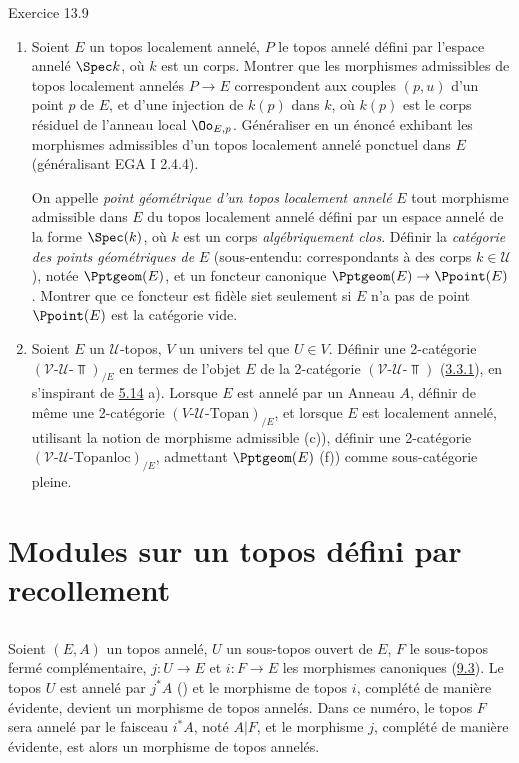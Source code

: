 \documentclass[10pt]{../fichiers-configuration-latex/smfart}
\begin{document}
\begin{enonce*}[remark]{Exercice 13.9}
\begin{enumerate}
\item Soient $E$ un topos localement annelé, $P$ le topos annelé
défini par l'espace annelé $\Spec k$, où $k$ est un corps. Montrer
que les morphismes admissibles de topos localement annelés
$P\rightarrow E$ correspondent aux couples $(p,u)$ d'un point $p$ de
$E$, et d'une injection de $k(p)$ dans $k$, où $k(p)$ est le corps
résiduel de l'anneau local ${\Oo}_{E,p}$. Généraliser en un
énoncé exhibant les morphismes admissibles d'un topos localement
annelé ponctuel dans $E$ (généralisant EGA I 2.4.4).

On appelle \emph{point géométrique d'un topos localement
  annelé} $E$
tout morphisme admissible dans $E$ du topos localement annelé défini
par un espace annelé de la forme $\Spec(k)$, où $k$ est un corps
\emph{algébriquement clos}. Définir la \emph{catégorie des points
géométriques de} $E$ (sous-entendu: correspondants à des corps $k\in
𝒰$), notée $\Pptgeom(E)$, et un foncteur canonique
$\Pptgeom(E)\rightarrow \Ppoint(E)$. Montrer que ce foncteur est
fidèle si\pageoriginale et seulement si $E$ n'a pas de point \ie
$\Ppoint(E)$ est la catégorie vide.

\item Soient $E$ un $𝒰$-topos, $V$ un univers tel que $U\in
V$. Définir une 2-catégorie
$(𝒱\text{-}𝒰\text{-}\Top)_{/E}$ en termes de l'objet
$E$ de la 2-catégorie $(𝒱\text{-}𝒰\text{-}\Top)$
(\hyperref[IV.subsubsec3.3.1]{3.3.1}), en s'inspirant de \hyperref[IV.exer5.14]{5.14} a).
Lorsque $E$ est annelé par un Anneau $A$, définir de même une
2-catégorie $(V\text{-}𝒰\text{-}\text{Topan})_{/E}$, et
lorsque $E$ est localement annelé, utilisant la notion de morphisme
admissible (\cf c)), définir une 2-catégorie
$(𝒱\text{-}𝒰\text{-}\text{Topanloc})_{/E}$,
admettant $\Pptgeom(E)$ (\cf f)) comme sous-catégorie pleine.
\end{enumerate}
\end{enonce*}

\section{Modules sur un topos défini par recollement}

\subsection{}
Soient $(E,A)$ un topos annelé, $U$ un sous-topos ouvert de $E$, $F$
le sous-topos fermé complémentaire, $j:U\rightarrow E$ et
$i:F\rightarrow E$ les morphismes canoniques (\hyperref[IV.subsec9.3]{9.3}).
Le topos $U$ est annelé par $j^{\ast}A$ ()
et le morphisme de topos $i$, complété de manière évidente, devient
un morphisme de topos annelés. Dans ce numéro, le topos $F$ sera
annelé par le faisceau $i^{\ast}A$, noté $A| F$, et le morphisme
$j$, complété de manière évidente, est alors un morphisme de topos
annelés.
\end{document}
